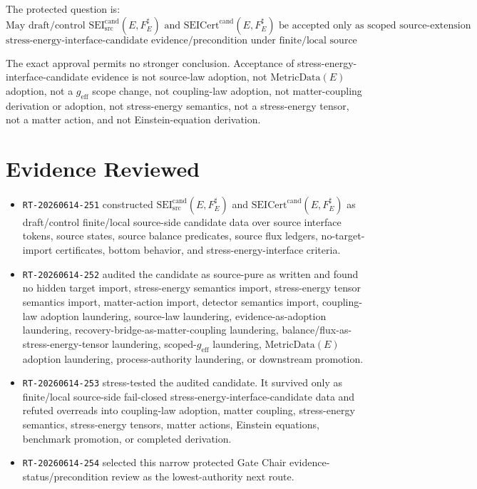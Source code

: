 \documentclass[11pt]{article}
\newcommand{\MetricData}{\mathrm{MetricData}}
\newcommand{\geff}{g_{\mathrm{eff}}}
\newcommand{\SEICand}{\mathrm{SEI}_{\mathrm{src}}^{\mathrm{cand}}}
\newcommand{\SEICertCand}{\mathrm{SEICert}^{\mathrm{cand}}}
\begin{document}
The protected question is:
\[
\text{May draft/control }\SEICand(E,F_E^\sharp)
\text{ and }
\SEICertCand(E,F_E^\sharp)
\text{ be accepted only as scoped source-extension}
\]
\[
\text{stress-energy-interface-candidate evidence/precondition under finite/local source scope?}
\]

The exact approval permits no stronger conclusion. Acceptance of
stress-energy-interface-candidate evidence is not source-law adoption, not
\(\MetricData(E)\) adoption, not a \(\geff\) scope change, not coupling-law
adoption, not matter-coupling derivation or adoption, not stress-energy
semantics, not a stress-energy tensor, not a matter action, and not
Einstein-equation derivation.

\section{Evidence Reviewed}

\begin{itemize}[leftmargin=*]
  \item \texttt{RT-20260614-251} constructed \(\SEICand(E,F_E^\sharp)\) and
  \(\SEICertCand(E,F_E^\sharp)\) as draft/control finite/local source-side
  candidate data over source interface tokens, source states, source balance
  predicates, source flux ledgers, no-target-import certificates, bottom
  behavior, and stress-energy-interface criteria.
  \item \texttt{RT-20260614-252} audited the candidate as source-pure as
  written and found no hidden target import, stress-energy semantics import,
  stress-energy tensor semantics import, matter-action import, detector
  semantics import, coupling-law adoption laundering, source-law laundering,
  evidence-as-adoption laundering, recovery-bridge-as-matter-coupling
  laundering, balance/flux-as-stress-energy-tensor laundering,
  scoped-\(\geff\) laundering, \(\MetricData(E)\) adoption laundering,
  process-authority laundering, or downstream promotion.
  \item \texttt{RT-20260614-253} stress-tested the audited candidate. It
  survived only as finite/local source-side fail-closed
  stress-energy-interface-candidate data and refuted overreads into
  coupling-law adoption, matter coupling, stress-energy semantics,
  stress-energy tensors, matter actions, Einstein equations, benchmark
  promotion, or completed derivation.
  \item \texttt{RT-20260614-254} selected this narrow protected Gate Chair
  evidence-status/precondition review as the lowest-authority next route.
\end{itemize}
\end{document}
